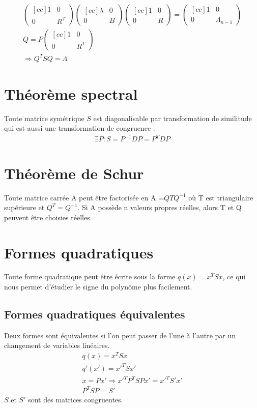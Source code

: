 \documentclass[a4paper]{book}
\begin{document}
\begin{gather*}
    \begin{pmatrix}[cc]
    1&0\\
    0&R^T
    \end{pmatrix}
    \begin{pmatrix}[cc]
    \lambda&0\\
    0&B
    \end{pmatrix}
    \begin{pmatrix}[cc]
    1&0\\
    0&R
    \end{pmatrix} = \begin{pmatrix}[cc]
    1&0\\
    0&\Lambda_{n-1}
    \end{pmatrix} \\
    Q = P\begin{pmatrix}[cc]
    1&0\\
    0&R^T
    \end{pmatrix} \\
    \Rightarrow Q^TSQ = \Lambda
\end{gather*}
\section{Théorème spectral}
Toute matrice symétrique $S$ est diagonalisable par transformation de similitude qui est aussi une transformation de congruence :
\begin{gather}
    \exists P : S = P^{-1}DP = P^TDP
\end{gather}
\section{Théorème de Schur}
Toute matrice carrée A peut être factorisée en A =$QTQ^{-1}$ où T est triangulaire supérieure et $Q^T = Q^{-1}$. Si A possède n valeurs propres réelles, alors T et Q peuvent être choisies réelles.
\section{Formes quadratiques}
Toute forme quadratique peut être écrite sous la forme $q(x) = x^TSx$, ce qui nous permet d'étudier le signe du polynôme plus facilement.
\subsection{Formes quadratiques équivalentes}
Deux formes sont équivalentes si l'on peut passer de l'une à l'autre par un changement de variables linéaires.
\begin{gather}
    q(x) = x^TSx \\
    q'(x') = x'^TSx' \\
    x = Px' \Rightarrow x'^TP^TSPx' = x'^TS'x' \\
    P^T S P = S'
\end{gather}
$S$ et $S'$ sont des matrices congruentes.
\end{document}
